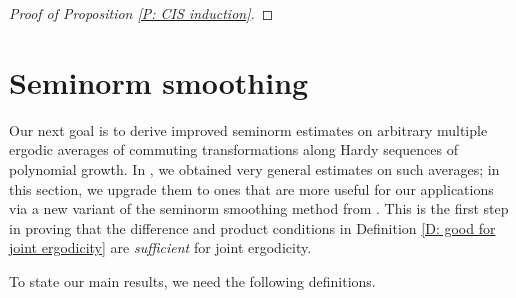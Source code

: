 \documentclass[11pt]{amsart}
\theoremstyle{definition}
\newcommand{\1}{{\mathbf{1}}}
\begin{document}
\begin{proof}[Proof of Proposition \ref{P: CIS induction}]
\end{proof}


\section{Seminorm smoothing}\label{S: smoothing}
Our next goal is to derive improved seminorm estimates on arbitrary multiple ergodic averages of commuting transformations along Hardy sequences of polynomial growth. In \cite[Theorem 10.1]{DKKST24}, we obtained very general estimates on such averages; in this section, we upgrade them to ones that are more useful for our applications via a new variant of the seminorm smoothing method from \cite{DKKST24, FrKu22b, FrKu22a}. This is the first step in proving that the difference and product conditions in Definition \ref{D: good for joint ergodicity} are \textit{sufficient} for joint ergodicity.

To state our main results, we need the following definitions. %
\end{document}
